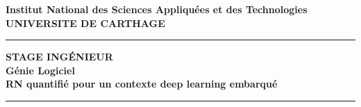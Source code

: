 \begin{titlepage}
   \begin{center}
   \begin{doublespacing}

       \begin{figure}
       \begin{center}

        \begin{minipage}[c]{0.8\textwidth}
        \end{minipage}
        \hfill
        \hfill
        \end{center}
        \end{figure}
       
       {\Large\textbf{Institut National des Sciences Appliquées et des Technologies}\\}
       {\Large\textbf{UNIVERSITE DE CARTHAGE}\\}
       \noindent\rule{15cm}{0.4pt}
       {\Huge\textbf{STAGE INGÉNIEUR}\\}
       {\large\textbf{Génie Logiciel}\\}
       {\Large\textbf{RN quantifié pour un contexte deep learning embarqué}\\}

       \vspace{10 mm}
       \vspace{2.5 mm}
       {\huge\textbf{}}
       \noindent\rule{15cm}{0.5pt}
       \vspace{10 mm}
       


\end{doublespacing}
\end{center}
\end{titlepage}
